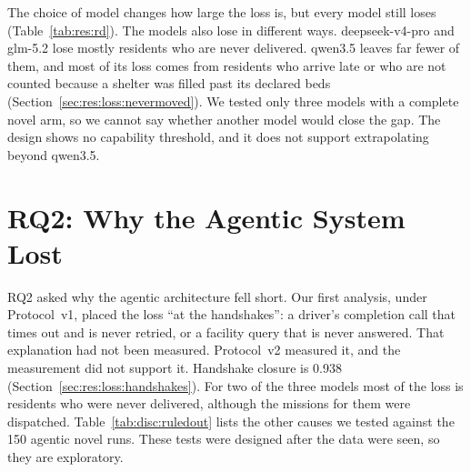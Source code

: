 The choice of model changes how large the loss is, but every model still
loses (Table~\ref{tab:res:rd}). The models also lose in different ways.
deepseek-v4-pro and glm-5.2 lose mostly residents who are never delivered.
qwen3.5 leaves far fewer of them, and most of its loss comes from residents
who arrive late or who are not counted because a shelter was filled past its
declared beds (Section~\ref{sec:res:loss:nevermoved}). We tested only
three models with a complete novel arm, so we cannot say whether another
model would close the gap. The design shows no capability threshold, and it
does not support extrapolating beyond qwen3.5.

\section{RQ2: Why the Agentic System Lost}
\label{sec:disc:mechanism}

RQ2 asked why the agentic architecture fell short. Our first analysis, under
Protocol~v1, placed the loss ``at the handshakes'': a driver's completion call
that times out and is never retried, or a facility query that is never
answered. That explanation had not been measured. Protocol~v2 measured it,
and the measurement did not support it. Handshake closure is 0.938
(Section~\ref{sec:res:loss:handshakes}). For two of the three models most of
the loss is residents who were never delivered, although the missions for
them were dispatched. Table~\ref{tab:disc:ruledout} lists the other causes we
tested against the 150 agentic novel runs. These tests were designed after
the data were seen, so they are exploratory.

